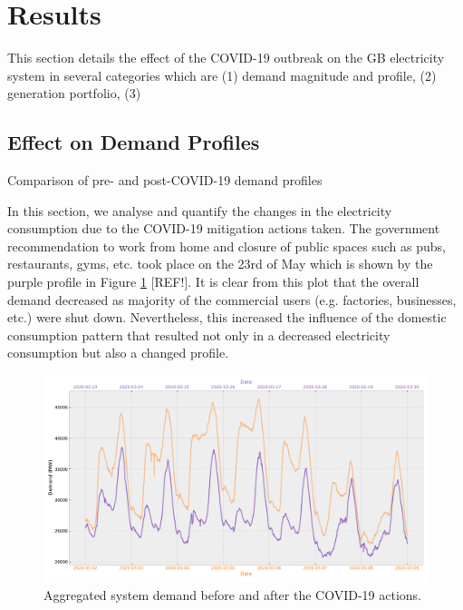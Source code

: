 \documentclass[energies,article,submit,moreauthors,pdftex]{Definitions/mdpi}
\begin{document}

\section{Results}
This section details the effect of the COVID-19 outbreak on the GB electricity system in several categories which are (1) demand magnitude and profile, (2) generation portfolio, (3)


\subsection{Effect on Demand Profiles}\label{section: Effect on demand profile}
Comparison of pre- and post-COVID-19 demand profiles

In this section, we analyse and quantify the changes in the electricity consumption due to the COVID-19 mitigation actions taken. The government recommendation to work from home and closure of public spaces such as pubs, restaurants, gyms, etc. took place on the 23rd of May which is shown by the purple profile in Figure \ref{fig:demand_profiles} [REF!]. It is clear from this plot that the overall demand decreased as majority of the commercial users (e.g. factories, businesses, etc.) were shut down. Nevertheless, this increased the influence of the domestic consumption pattern that resulted not only in a decreased electricity consumption  but also a changed profile.

\begin{figure}[H]
\centering
\hspace{-25pt}\includegraphics[width=15 cm]{Graphics/Demand_profiles.pdf}
\caption{Aggregated system demand before and after the COVID-19 actions.}\label{fig:demand_profiles}
\end{figure}  
\end{document}
